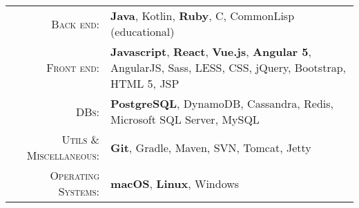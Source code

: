 %
%
%

\renewcommand{\arraystretch}{1.1}

	\begin{tabular}{>{}r>{}p{13cm}}
		\textsc{Back end:} &
			\textbf{Java}, Kotlin, \textbf{Ruby}, C, CommonLisp (educational) \\
		\textsc{Front end:} &
			\textbf{Javascript}, \textbf{React}, \textbf{Vue.js}, \textbf{Angular 5}, AngularJS, Sass, LESS, CSS, jQuery, Bootstrap, HTML 5, JSP \\
		\textsc{DBs:} &
			\textbf{PostgreSQL}, DynamoDB, Cassandra, Redis, Microsoft SQL Server, MySQL \\
		\textsc{Utils \& Miscellaneous:} &
			\textbf{Git}, Gradle, Maven, SVN, Tomcat, Jetty \\
		\textsc{Operating Systems:} &
			\textbf{macOS}, \textbf{Linux}, Windows \\
	\end{tabular}
